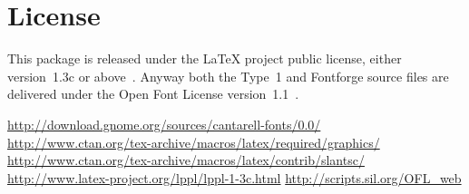 \documentclass{article}
\begin{document}
\section{License}

This package is released under the \LaTeX{} project public license, either
version~1.3c or above~\cite{lppl}. Anyway both the Type~1 and Fontforge source
files are delivered under the Open Font License version~1.1~\cite{ofl}.

\begin{thebibliography}{9}
 \url{http://download.gnome.org/sources/cantarell-fonts/0.0/}
  \url{http://www.ctan.org/tex-archive/macros/latex/required/graphics/}
  \url{http://www.ctan.org/tex-archive/macros/latex/contrib/slantsc/}
 \url{http://www.latex-project.org/lppl/lppl-1-3c.html}
 \url{http://scripts.sil.org/OFL_web}
\end{thebibliography}
\end{document}
